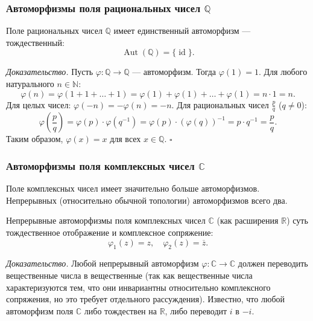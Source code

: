 \documentclass[a4paper,12pt]{article}
\theoremstyle{definition}
\theoremstyle{plain}
\theoremstyle{remark}
\begin{document}
	\subsubsection*{Автоморфизмы поля рациональных чисел \( \mathbb{Q} \)}
	
	\begin{tcolorbox}[colback=blue!5, colframe=blue!40!black, title=Теорема]
		Поле рациональных чисел \( \mathbb{Q} \) имеет единственный автоморфизм — тождественный:
		\[
		\operatorname{Aut}(\mathbb{Q}) = \{ \operatorname{id} \}.
		\]
	\end{tcolorbox}
	
	\medskip
	\textit{Доказательство.}
	Пусть \( \varphi: \mathbb{Q} \to \mathbb{Q} \) — автоморфизм. Тогда \( \varphi(1) = 1 \). Для любого натурального \( n \in \mathbb{N} \):
	\[
	\varphi(n) = \varphi(1 + 1 + \dots + 1) = \varphi(1) + \varphi(1) + \dots + \varphi(1) = n \cdot 1 = n.
	\]
	Для целых чисел: \( \varphi(-n) = -\varphi(n) = -n \). Для рациональных чисел \( \frac{p}{q} \) (\( q \neq 0 \)):
	\[
	\varphi\left(\frac{p}{q}\right) = \varphi(p) \cdot \varphi(q^{-1}) = \varphi(p) \cdot (\varphi(q))^{-1} = p \cdot q^{-1} = \frac{p}{q}.
	\]
	Таким образом, \( \varphi(x) = x \) для всех \( x \in \mathbb{Q} \). \hfill \(\square\)
	
	\subsubsection*{Автоморфизмы поля комплексных чисел \( \mathbb{C} \)}
	
	Поле комплексных чисел имеет значительно больше автоморфизмов. Непрерывных (относительно обычной топологии) автоморфизмов всего два.
	
	\begin{tcolorbox}[colback=blue!5, colframe=blue!40!black, title=Теорема]
		Непрерывные автоморфизмы поля комплексных чисел \( \mathbb{C} \) (как расширения \( \mathbb{R} \)) суть тождественное отображение и комплексное сопряжение:
		\[
		\varphi_1(z) = z, \quad \varphi_2(z) = \overline{z}.
		\]
	\end{tcolorbox}
	
	\medskip
	\textit{Доказательство.}
	Любой непрерывный автоморфизм \( \varphi: \mathbb{C} \to \mathbb{C} \) должен переводить вещественные числа в вещественные (так как вещественные числа характеризуются тем, что они инвариантны относительно комплексного сопряжения, но это требует отдельного рассуждения). Известно, что любой автоморфизм поля \( \mathbb{C} \) либо тождествен на \( \mathbb{R} \), либо переводит \( i \) в \( -i \).
	
\end{document}
